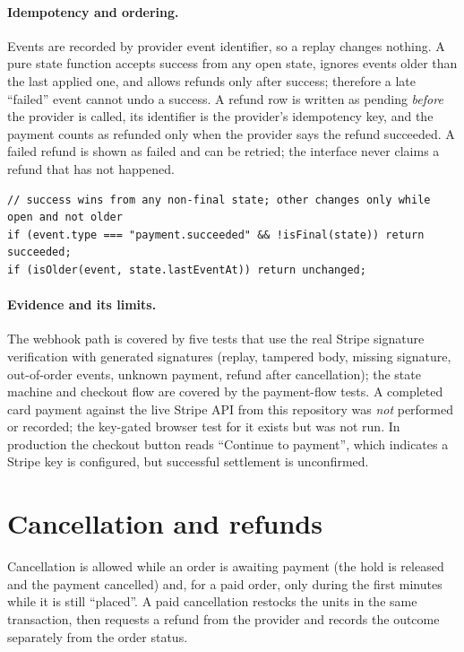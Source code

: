 \paragraph{Idempotency and ordering.} Events are recorded by provider event identifier, so a replay changes nothing. A pure state function accepts success from any open state, ignores events older than the last applied one, and allows refunds only after success; therefore a late ``failed'' event cannot undo a success. A refund row is written as pending \emph{before} the provider is called, its identifier is the provider's idempotency key, and the payment counts as refunded only when the provider says the refund succeeded. A failed refund is shown as failed and can be retried; the interface never claims a refund that has not happened.

\begin{lstlisting}[caption={Rule from the payment state function, simplified.},label={lst:paystate}]
// success wins from any non-final state; other changes only while open and not older
if (event.type === "payment.succeeded" && !isFinal(state)) return succeeded;
if (isOlder(event, state.lastEventAt)) return unchanged;
\end{lstlisting}

\paragraph{Evidence and its limits.} The webhook path is covered by five tests that use the real Stripe signature verification with generated signatures (replay, tampered body, missing signature, out-of-order events, unknown payment, refund after cancellation); the state machine and checkout flow are covered by the payment-flow tests. \tagtest{} A completed card payment against the live Stripe API from this repository was \emph{not} performed or recorded; the key-gated browser test for it exists but was not run. \tagunver{} In production the checkout button reads ``Continue to payment'', which indicates a Stripe key is configured, but successful settlement is unconfirmed.

\section{Cancellation and refunds}

Cancellation is allowed while an order is awaiting payment (the hold is released and the payment cancelled) and, for a paid order, only during the first minutes while it is still ``placed''. A paid cancellation restocks the units in the same transaction, then requests a refund from the provider and records the outcome separately from the order status.
